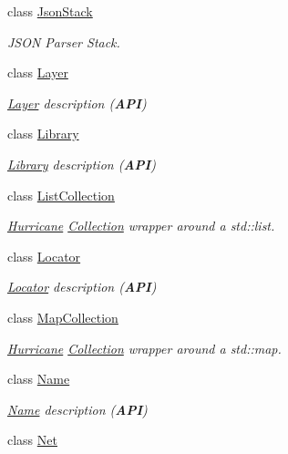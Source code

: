 \begin{DoxyCompactItemize}
class \hyperlink{classHurricane_1_1JsonStack}{Json\+Stack}
\begin{DoxyCompactList}\small\item\em J\+S\+ON Parser Stack. \end{DoxyCompactList}\item 
class \hyperlink{classHurricane_1_1Layer}{Layer}
\begin{DoxyCompactList}\small\item\em \hyperlink{classHurricane_1_1Layer}{Layer} description ({\bfseries A\+PI}) \end{DoxyCompactList}\item 
class \hyperlink{classHurricane_1_1Library}{Library}
\begin{DoxyCompactList}\small\item\em \hyperlink{classHurricane_1_1Library}{Library} description ({\bfseries A\+PI}) \end{DoxyCompactList}\item 
class \hyperlink{classHurricane_1_1ListCollection}{List\+Collection}
\begin{DoxyCompactList}\small\item\em \hyperlink{namespaceHurricane}{Hurricane} \hyperlink{classHurricane_1_1Collection}{Collection} wrapper around a std\+::list. \end{DoxyCompactList}\item 
class \hyperlink{classHurricane_1_1Locator}{Locator}
\begin{DoxyCompactList}\small\item\em \hyperlink{classHurricane_1_1Locator}{Locator} description ({\bfseries A\+PI}) \end{DoxyCompactList}\item 
class \hyperlink{classHurricane_1_1MapCollection}{Map\+Collection}
\begin{DoxyCompactList}\small\item\em \hyperlink{namespaceHurricane}{Hurricane} \hyperlink{classHurricane_1_1Collection}{Collection} wrapper around a std\+::map. \end{DoxyCompactList}\item 
class \hyperlink{classHurricane_1_1Name}{Name}
\begin{DoxyCompactList}\small\item\em \hyperlink{classHurricane_1_1Name}{Name} description ({\bfseries A\+PI}) \end{DoxyCompactList}\item 
class \hyperlink{classHurricane_1_1Net}{Net}

\end{DoxyCompactItemize}
